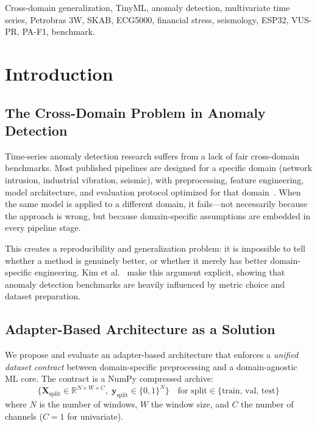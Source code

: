 \documentclass[conference]{IEEEtran}
\begin{document}
\begin{IEEEkeywords}
Cross-domain generalization, TinyML, anomaly detection, multivariate time
series, Petrobras 3W, SKAB, ECG5000, financial stress, seismology, ESP32,
VUS-PR, PA-F1, benchmark.
\end{IEEEkeywords}

\section{Introduction}
\label{sec:intro}

\subsection{The Cross-Domain Problem in Anomaly Detection}

Time-series anomaly detection research suffers from a lack of fair
cross-domain benchmarks.
Most published pipelines are designed for a specific domain (network
intrusion, industrial vibration, seismic), with preprocessing, feature
engineering, model architecture, and evaluation protocol optimized for
that domain~\cite{pang2021deep,chandola2009anomaly}.
When the same model is applied to a different domain, it fails---not
necessarily because the approach is wrong, but because domain-specific
assumptions are embedded in every pipeline stage.

This creates a reproducibility and generalization problem:
it is impossible to tell whether a method is genuinely better, or
whether it merely has better domain-specific engineering.
Kim et al.~\cite{kim2022towards} make this argument explicit, showing that
anomaly detection benchmarks are heavily influenced by metric choice and
dataset preparation.

\subsection{Adapter-Based Architecture as a Solution}

We propose and evaluate an adapter-based architecture that enforces a
\emph{unified dataset contract} between domain-specific preprocessing and
a domain-agnostic ML core.
The contract is a NumPy compressed archive:
\begin{equation}
  \{\mathbf{X}_\text{split} \in \mathbb{R}^{N \times W \times C},\;
    \mathbf{y}_\text{split} \in \{0,1\}^N\}
  \quad \text{for } \text{split} \in \{\text{train, val, test}\}
\end{equation}
where $N$ is the number of windows, $W$ the window size, and $C$ the
number of channels ($C=1$ for univariate).
\end{document}
